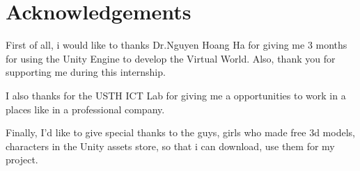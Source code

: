 \documentclass[a4paper, 13pt]{extarticle}
\begin{document}
\newpage

\newpage
\section*{\color{cyan}\Large Acknowledgements}

First of all, i would like to thanks Dr.Nguyen Hoang Ha for giving me 3 months for using the Unity Engine to develop the Virtual World. Also, thank you for supporting me during this internship. 

I also thanks for the USTH ICT Lab for giving me a opportunities to work in a places like in a professional company. 

Finally, I'd like to give special thanks to the guys, girls who made free 3d models, characters in the Unity assets store, so that i can download, use them for my project.
\newpage
 
 \newpage
 \appendix
  \renewcommand{\thesubsection}{\Alph{section}}
 \renewcommand{\thesubsection}{\arabic{subsection}}
\end{document}
